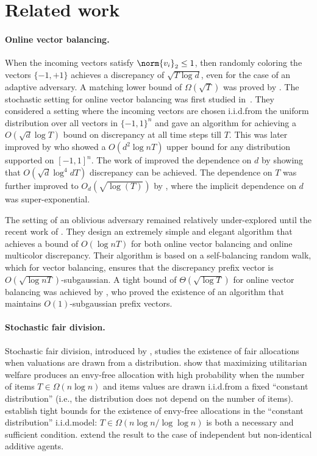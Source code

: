 \section{Related work}
\paragraph{Online vector balancing.}
    When the incoming vectors satisfy $\norm{v_i}_2 \leq 1$, then randomly coloring the vectors $\{-1,+1\}$ achieves a discrepancy of $\sqrt{T \log{d}}$, even for the case of an adaptive adversary. A  matching lower bound of $\Omega(\sqrt{T})$ was proved by \citet{spencer1977balancing,spencer1994ten}. The stochastic setting for online vector balancing was first studied in~\cite{bansal2020line}. They considered a setting where the incoming vectors are chosen i.i.d.\@ from the uniform distribution over all vectors in $\{-1,1\}^n$ and gave an algorithm for achieving a $O(\sqrt{d}\log{T})$ bound on discrepancy at all time steps till $T$. This was later improved by \citet{bansal2020online} who showed a $O(d^2 \log{nT})$ upper bound for any distribution supported on $[-1,1]^n$. The work of \citet{bansal2021online} improved the dependence on $d$ by showing that $O(\sqrt{d}\log^4{dT})$ discrepancy can be achieved. The dependence on $T$ was further improved to $O_d(\sqrt{\log(T)})$ by \citet{aru2016balancing}, where the implicit dependence on $d$ was super-exponential. 
    
    The setting of an oblivious adversary remained relatively under-explored until the recent work of \citet{alweiss2021discrepancy}. They design an extremely simple and elegant algorithm that achieves a bound of $O(\log{nT})$ for both online vector balancing and online multicolor discrepancy. Their algorithm is based on a self-balancing random walk, which for vector balancing, ensures that the discrepancy prefix vector is $O(\sqrt{\log{nT}})$-subgaussian. A tight bound of $\Theta(\sqrt{\log{T}})$ for online vector balancing was achieved by \citet{kulkarni2024optimal}, who proved the existence of an algorithm that maintains $O(1)$-subgaussian prefix vectors.


\paragraph{Stochastic fair division.}

Stochastic fair division, introduced by \citet{dickerson2014computational}, studies the existence of fair allocations when valuations are drawn from a distribution. \citeauthor{dickerson2014computational} show that maximizing utilitarian welfare produces an envy-free allocation with high probability when the number of items $T \in \Omega(n \log n)$ and items values are drawn i.i.d.\@ from a fixed ``constant distribution'' (i.e., the distribution does not depend on the number of items). \citet{manurangsi2020envy,manurangsi2021closing} establish tight bounds for the existence of envy-free allocations in the ``constant distribution'' i.i.d.\@ model: $T \in \Omega (n \log n / \log \log n )$ is both a necessary and sufficient condition. \citet{bai2021envy} extend the result to the case of independent but non-identical additive agents.

